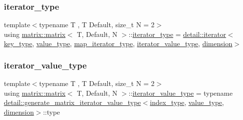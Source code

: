 \subsubsection{\texorpdfstring{iterator\+\_\+type}{iterator\_type}}
{\footnotesize\ttfamily template$<$typename T , T Default, size\+\_\+t N = 2$>$ \\
using \hyperlink{structmatrix_1_1matrix}{matrix\+::matrix}$<$ T, Default, N $>$\+::\hyperlink{structmatrix_1_1matrix_a82eef2feb50cdf62ced121fb74d3bc67}{iterator\+\_\+type} =  \hyperlink{structmatrix_1_1detail_1_1iterator}{detail\+::iterator}$<$\hyperlink{structmatrix_1_1matrix_af7b5498ac1b615cb9ef51bd185a2557e}{key\+\_\+type}, \hyperlink{structmatrix_1_1matrix_ab940e7a84942339cdee7c0f0d3bd8ef9}{value\+\_\+type}, \hyperlink{structmatrix_1_1matrix_a718c745a811e13b64ba21239288666a6}{map\+\_\+iterator\+\_\+type}, \hyperlink{structmatrix_1_1matrix_a1de5c69f5d9e3b6d3e54b1e4cb433d65}{iterator\+\_\+value\+\_\+type}, \hyperlink{structmatrix_1_1matrix_a7d76bd51fd998974f59ea4035e053f74}{dimension}$>$}

\mbox{\label{structmatrix_1_1matrix_a1de5c69f5d9e3b6d3e54b1e4cb433d65}} 
\subsubsection{\texorpdfstring{iterator\+\_\+value\+\_\+type}{iterator\_value\_type}}
{\footnotesize\ttfamily template$<$typename T , T Default, size\+\_\+t N = 2$>$ \\
using \hyperlink{structmatrix_1_1matrix}{matrix\+::matrix}$<$ T, Default, N $>$\+::\hyperlink{structmatrix_1_1matrix_a1de5c69f5d9e3b6d3e54b1e4cb433d65}{iterator\+\_\+value\+\_\+type} =  typename \hyperlink{classmatrix_1_1detail_1_1generate__matrix__iterator__value__type}{detail\+::generate\+\_\+matrix\+\_\+iterator\+\_\+value\+\_\+type}$<$\hyperlink{structmatrix_1_1matrix_a87b61e7f35dcd5991cd3f243cfeced06}{index\+\_\+type}, \hyperlink{structmatrix_1_1matrix_ab940e7a84942339cdee7c0f0d3bd8ef9}{value\+\_\+type}, \hyperlink{structmatrix_1_1matrix_a7d76bd51fd998974f59ea4035e053f74}{dimension}$>$\+::type}

\mbox{\label{structmatrix_1_1matrix_af7b5498ac1b615cb9ef51bd185a2557e}} 
